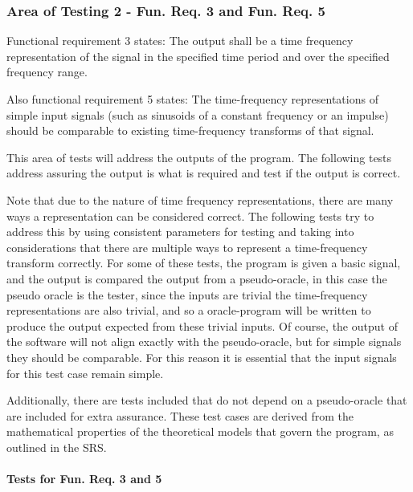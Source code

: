 \documentclass[12pt, titlepage]{article}
\begin{document}
\subsubsection{Area of Testing 2 - Fun. Req. 3 and Fun. Req. 5} \label{test_req35}
Functional requirement 3 states: The output shall be a time frequency representation of the signal in the specified time period and over the specified frequency range.

Also functional requirement 5 states: The time-frequency representations of simple input signals (such as sinusoids of a constant frequency or an impulse) should be comparable to existing time-frequency transforms of that signal.

This area of tests will address the outputs of the program. The following tests address assuring the output is what is required and test if the output is correct. 

Note that due to the nature of time frequency representations, there are many ways a representation can be considered correct. The following tests try to address this by using consistent parameters for testing and taking into considerations that there are multiple ways to represent a time-frequency transform correctly. For some of these tests, the program is given a basic signal, and the output is compared the output from a pseudo-oracle, in this case the pseudo oracle is the tester, since the inputs are trivial the time-frequency representations are also trivial, and so a oracle-program will be written to produce the output expected from these trivial inputs. Of course, the output of the software \progname{} will not align exactly with the pseudo-oracle, but for simple signals they should be comparable. For this reason it is essential that the input signals for this test case remain simple.

Additionally, there are tests included that do not depend on a pseudo-oracle that are included for extra assurance. These test cases are derived from the mathematical properties of the theoretical models that govern the program, as outlined in the SRS.


\paragraph{Tests for Fun. Req. 3 and 5}
\end{document}
